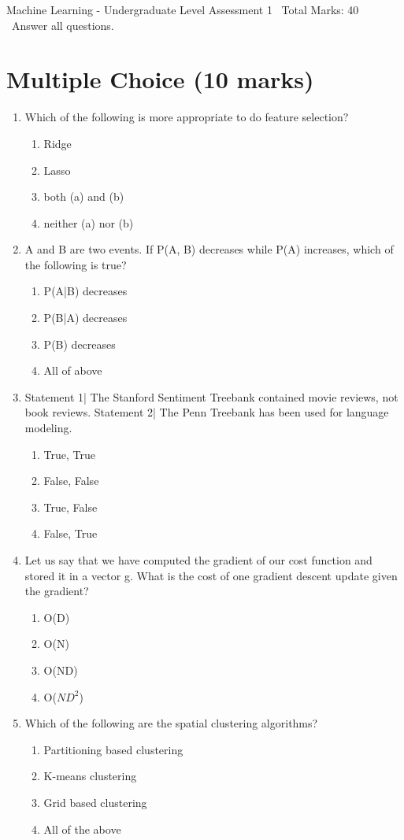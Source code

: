 \documentclass[12pt]{article}
\begin{document}
\begin{center}
Machine Learning - Undergraduate Level Assessment 1 \
Total Marks: 40 \
Answer all questions.
\end{center}

\section*{Multiple Choice (10 marks)}
\begin{enumerate}[label=\arabic*.]
\item Which of the following is more appropriate to do feature selection?
\begin{enumerate}[label=(\alph*)]
    \item Ridge
    \item Lasso
    \item both (a) and (b)
    \item neither (a) nor (b)
\end{enumerate}
\item A and B are two events. If P(A, B) decreases while P(A) increases, which of the following is true?
\begin{enumerate}[label=(\alph*)]
    \item P(A|B) decreases
    \item P(B|A) decreases
    \item P(B) decreases
    \item All of above
\end{enumerate}
\item Statement 1| The Stanford Sentiment Treebank contained movie reviews, not book reviews. Statement 2| The Penn Treebank has been used for language modeling.
\begin{enumerate}[label=(\alph*)]
    \item True, True
    \item False, False
    \item True, False
    \item False, True
\end{enumerate}
\item Let us say that we have computed the gradient of our cost function and stored it in a vector g. What is the cost of one gradient descent update given the gradient?
\begin{enumerate}[label=(\alph*)]
    \item O(D)
    \item O(N)
    \item O(ND)
    \item O($ND^2$)
\end{enumerate}
\item Which of the following are the spatial clustering algorithms?
\begin{enumerate}[label=(\alph*)]
    \item Partitioning based clustering
    \item K-means clustering
    \item Grid based clustering
    \item All of the above
\end{enumerate}
\end{enumerate}
\end{document}
